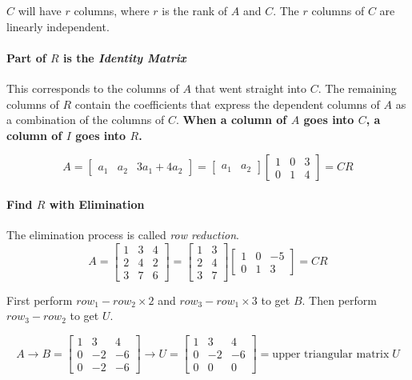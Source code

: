 \noindent$C$ will have $r$ columns, where $r$ is the rank of $A$ and $C$. The $r$ columns of $C$ are linearly independent.

\paragraph{Part of $R$ is the \textit{Identity Matrix}} This corresponds to the columns of $A$ that went straight into $C$. The remaining columns of $R$ contain the coefficients that express the dependent columns of $A$ as a combination of the columns of $C$.
\textbf{When a column of $A$ goes into $C$, a column of $I$ goes into $R$.}

\setcounter{example}{0}
\begin{example}
	\[
		A = \begin{bmatrix}
			a_1 & a_2 & 3a_1 + 4a_2
		\end{bmatrix}
		= \begin{bmatrix}
			a_1 & a_2
		\end{bmatrix}
		\begin{bmatrix}
			1 & 0 & 3 \\
			0 & 1 & 4
		\end{bmatrix}
		= CR
	\]
\end{example}

\paragraph{Find $R$ with Elimination} The elimination process is called \textit{row reduction}.
\[
	A = \begin{bmatrix}
		1 & 3 & 4 \\
		2 & 4 & 2 \\
		3 & 7 & 6
	\end{bmatrix}
	= \begin{bmatrix}
		1 & 3 \\
		2 & 4 \\
		3 & 7
	\end{bmatrix}
	\begin{bmatrix}
		1 & 0 & -5 \\
		0 & 1 & 3
	\end{bmatrix}
	= CR
\]

\noindent First perform $row_1 - row_2 \times 2$ and $row_3 - row_1 \times 3$ to get $B$.
Then perform $row_3 - row_2$ to get $U$.

\[
	A \rightarrow B = \begin{bmatrix}
		1 & 3  & 4  \\
		0 & -2 & -6 \\
		0 & -2 & -6
	\end{bmatrix}
	\rightarrow U = \begin{bmatrix}
		1 & 3  & 4  \\
		0 & -2 & -6 \\
		0 & 0  & 0
	\end{bmatrix}
	= \text{upper triangular matrix} \; U
\]

